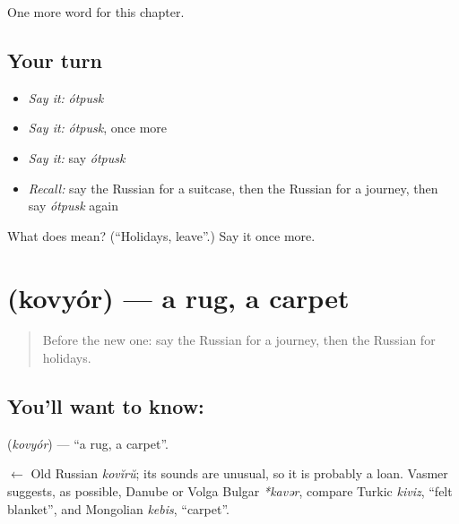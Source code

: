 \begin{grammarlens}[title={What you've built}]
One more word for this chapter.
\end{grammarlens}

\subsection*{Your turn}
\begin{itemize}
\raggedright
  \item \emph{Say it:} \emph{ótpusk}
  \item \emph{Say it:} \emph{ótpusk}, once more
  \item \emph{Say it:} say \emph{ótpusk}
  \item \emph{Recall:} say the Russian for a suitcase, then the Russian for a journey, then say \emph{ótpusk} again
\end{itemize}

\begin{tcolorbox}[breakable,colback=teal!4,colframe=teal!35!black,title={Before you move on}]
What does  mean? (\textquotedblleft{}Holidays, leave\textquotedblright{}.) Say it once more.
\end{tcolorbox}
\section[\texorpdfstring{\ru{ковёр} (kovyór)}{ковёр (kovyór)}]{ (kovyór) — a rug, a carpet}

\label{lesson:RU-C92-rug}



\begin{quote}
Before the new one: say the Russian for a journey, then the Russian for holidays.
\end{quote}

\subsection*{You'll want to know: }
\textbf{} (\emph{kovyór}) — \textquotedblleft{}a rug, a carpet\textquotedblright{}.

\begin{cousinweb}
\textbf{} $\leftarrow$ Old Russian \emph{kovĭrŭ}; its sounds are unusual, so it is probably a loan. Vasmer suggests, as possible, Danube or Volga Bulgar \emph{*kavər}, compare Turkic \emph{kiviz}, \textquotedblleft{}felt blanket\textquotedblright{}, and Mongolian \emph{kebis}, \textquotedblleft{}carpet\textquotedblright{}.
\end{cousinweb}

